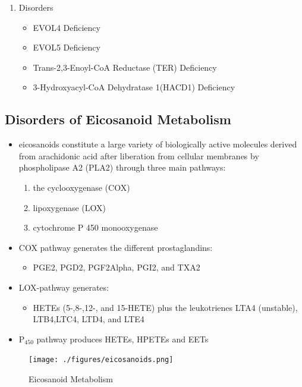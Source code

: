 \documentclass{scrartcl}
\begin{document}
\begin{enumerate}
\item Disorders
\label{sec:orgc032513}
\begin{itemize}
\item EVOL4 Deficiency
\item EVOL5 Deficiency
\item Trans-2,3-Enoyl-CoA Reductase (TER) Deficiency
\item 3-Hydroxyacyl-CoA Dehydratase 1(HACD1) Deficiency
\end{itemize}
\end{enumerate}

\subsection{Disorders of Eicosanoid Metabolism}
\label{sec:orgb5cc474}
\begin{itemize}
\item eicosanoids constitute a large variety of biologically active
molecules derived from arachidonic acid after liberation from
cellular membranes by phospholipase A2 (PLA2) through three main pathways:
\begin{enumerate}
\item the cyclooxygenase (COX)
\item lipoxygenase (LOX)
\item cytochrome P 450 monooxygenase
\end{enumerate}

\item COX pathway generates the different prostaglandins:
\begin{itemize}
\item PGE2, PGD2, PGF2Alpha, PGI2, and TXA2
\end{itemize}

\item LOX-pathway generates:
\begin{itemize}
\item HETEs (5-,8-,12-, and 15-HETE) plus the leukotrienes LTA4
(unstable), LTB4,LTC4, LTD4, and LTE4
\end{itemize}

\item P\(_{\text{450}}\) pathway produces HETEs, HPETEs and EETs
\end{itemize}

\begin{figure}[htbp]
\centering
\texttt{[image: ./figures/eicosanoids.png]}
\caption{\label{fig:org0cab4d3}
Eicosanoid Metabolism}
\end{figure}
\end{document}
